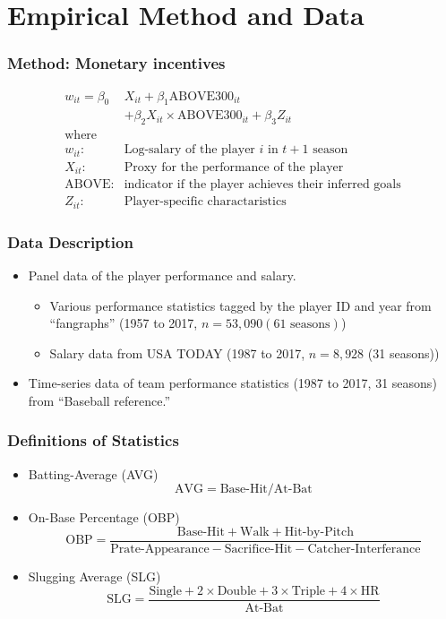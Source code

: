 \documentclass[dvipdfmx,12pt]{beamer}
\begin{document}
\section{Empirical Method and Data}

\begin{frame}\frametitle{Method: Monetary incentives}
 \begin{align*}
   w_{it} = \beta_0 & X_{it} + \beta_1 \text{ABOVE300}_{it} \\
   & + \beta_2 X_{it} \times \text{ABOVE300}_{it} + \beta_3 Z_{it} \\
   \text{where} \\
  w_{it}:& \text{Log-salary of the player } i \text{ in } t+1 \text{ season} \\
  X_{it}:& \text{Proxy for the performance of the player} \\
  \text{ABOVE}:& \text{indicator if the player achieves their inferred goals} \\
  Z_{it}:& \text{Player-specific charactaristics}
 \end{align*}
\end{frame}

\begin{frame}\frametitle{Data Description}
\begin{itemize}
  \item Panel data of the player performance and salary.
  \begin{itemize}
    \item Various performance statistics tagged by the player ID and year
    from ``fangraphs'' (1957 to 2017, $n=53,090 (61 \text{ seasons})$)

    \item Salary data from USA TODAY (1987 to 2017, $n=8,928$ (31 seasons))

  \end{itemize}

  \item Time-series data of team performance statistics (1987 to 2017, 31 seasons)
  from ``Baseball reference.''
\end{itemize}
\end{frame}

\begin{frame}\frametitle{Definitions of Statistics}
 \footnotesize
 \begin{itemize}
   \item Batting-Average (AVG)
    \[
    \text{AVG} = \text{Base-Hit}/\text{At-Bat}
    \]
   \item On-Base Percentage (OBP)
    \[
    \text{OBP} = \dfrac{\text{Base-Hit} + \text{Walk} + \text{Hit-by-Pitch}}{
    \text{Prate-Appearance} - \text{Sacrifice-Hit} - \text{Catcher-Interferance}
    }
    \]
    \item Slugging Average (SLG)
    \[\text{SLG} = \dfrac{\text{Single} + 2 \times \text{Double} + 3 \times
    \text{Triple} + 4 \times \text{HR}}{\text{At-Bat}}
    \]
 \end{itemize}
\end{frame}
\end{document}
